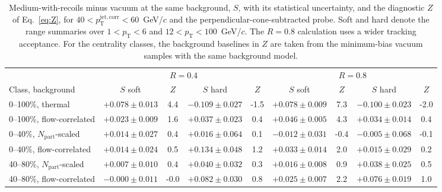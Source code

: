 \documentclass[aps,prc,twocolumn,superscriptaddress,nofootinbib,longbibliography,floatfix,10pt]{revtex4-2}
\newcommand{\pT}{p_{\mathrm T}}
\begin{document}
\begin{table}[t]
\caption{Medium-with-recoils minus vacuum at the same background, $S$, with its statistical uncertainty, and the diagnostic $Z$ of Eq.~\eqref{eq:Z}, for $40<p_{\mathrm T}^{\mathrm{jet,corr}}<60$~GeV/$c$ and the perpendicular-cone-subtracted probe. Soft and hard denote the range summaries over $1<\pT<6$ and $12<\pT<100$~GeV/$c$. The $R=0.8$ calculation uses a wider tracking acceptance. For the centrality classes, the background baselines in $Z$ are taken from the minimum-bias vacuum samples with the same background model.}
\label{tab:signals}
\begin{ruledtabular}
\begin{tabular}{lcccccccc}
 & \multicolumn{4}{c}{$R=0.4$} & \multicolumn{4}{c}{$R=0.8$}\\
Class, background & $S$ soft & $Z$ & $S$ hard & $Z$ & $S$ soft & $Z$ & $S$ hard & $Z$\\
0--100\%, thermal & $+0.078\pm0.013$ & 4.4 & $-0.109\pm0.027$ & -1.5 & $+0.078\pm0.009$ & 7.3 & $-0.100\pm0.023$ & -2.0 \\
0--100\%, flow-correlated & $+0.023\pm0.009$ & 1.6 & $+0.037\pm0.023$ & 0.4 & $+0.046\pm0.005$ & 4.3 & $+0.034\pm0.014$ & 0.4 \\
0--40\%, $N_{\mathrm{part}}$-scaled & $+0.014\pm0.027$ & 0.4 & $+0.016\pm0.064$ & 0.1 & $-0.012\pm0.031$ & -0.4 & $-0.005\pm0.068$ & -0.1 \\
0--40\%, flow-correlated & $+0.014\pm0.024$ & 0.5 & $+0.134\pm0.048$ & 1.2 & $+0.033\pm0.014$ & 2.0 & $+0.015\pm0.029$ & 0.2 \\
40--80\%, $N_{\mathrm{part}}$-scaled & $+0.007\pm0.010$ & 0.4 & $+0.040\pm0.032$ & 0.3 & $+0.016\pm0.008$ & 0.9 & $+0.038\pm0.025$ & 0.5 \\
40--80\%, flow-correlated & $-0.000\pm0.011$ & -0.0 & $+0.082\pm0.030$ & 0.8 & $+0.025\pm0.007$ & 2.2 & $+0.076\pm0.019$ & 1.0 \\
\end{tabular}
\end{ruledtabular}
\end{table}
\end{document}
